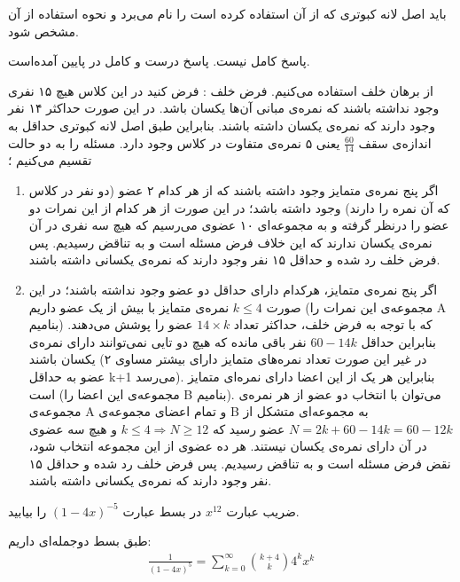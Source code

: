 \documentclass[11pt,largemargins]{h2wp}
\begin{document}
باید اصل لانه کبوتری که از آن استفاده کرده است را نام می‌برد و نحوه استفاده از آن مشخص شود.


پاسخ کامل نیست. پاسخ درست و کامل در پایین آمده‌است.




از برهان خلف استفاده می‌کنیم. فرض خلف : فرض کنید در این کلاس هیچ ۱۵ نفری وجود نداشته باشند که نمره‌ی مبانی آن‌ها یکسان باشد.
در این صورت حداکثر ۱۴ نفر وجود دارند که نمره‌ی یکسان داشته باشند. بنابراین  طبق اصل لانه کبوتری حداقل به اندازه‌ی سقف
$\frac{60}{14}$
یعنی ۵ نمره‌ی متفاوت در کلاس وجود دارد. مسئله را به دو حالت تقسیم می‌کنیم ؛
\begin{enumerate}
    \item 
    اگر پنج نمره‌ی متمایز وجود داشته باشند که از هر کدام ۲ عضو
    (دو نفر در کلاس که آن نمره را دارند)
    وجود داشته باشد؛ در این صورت از هر کدام از این نمرات دو عضو را درنظر گرفته و به مجموعه‌ای ۱۰ عضوی
    می‌رسیم که هیچ سه نفری در آن نمره‌ی یکسان ندارند که این خلاف فرض مسئله است و به تناقض رسیدیم.
    پس فرض خلف رد شده و حداقل ۱۵ نفر وجود دارند که نمره‌ی یکسانی داشته باشند.
    
    \item 
    اگر پنج نمره‌ی متمایز، هرکدام دارای حداقل دو عضو وجود نداشته باشند؛
    در این صورت 
    $k \le 4$
    نمره‌ی متمایز با بیش از یک عضو داریم
    (مجموعه‌ی این نمرات را A بنامیم)
    که با توجه به فرض خلف، حداکثر تعداد
    $14 \times k$
    عضو را پوشش می‌دهند. بنابراین حداقل 
    $60 - 14k$
    نفر باقی مانده که هیچ دو تایی نمی‌توانند دارای نمره‌ی یکسان باشند
    (در غیر این صورت تعداد نمره‌های متمایز دارای بیشتر مساوی ۲ عضو به حداقل k+1 می‌رسد).
    بنابراین هر یک از این اعضا دارای نمره‌ای متمایز است
    (مجموعه‌ی این اعضا را B بنامیم).
    می‌توان با انتخاب دو عضو از هر نمره‌ی مجموعه‌ی
    A
    و تمام اعضای مجموعه‌‌ی
    B
    به مجموعه‌ای متشکل از
    $N = 2k + 60 - 14k = 60 - 12k$
    عضو رسید که
    $k \le 4 \Rightarrow N \ge 12$
    و هیچ سه عضوی در آن دارای نمره‌ی یکسان نیستند.
    هر ده عضوی از این مجموعه انتخاب شود، نقض فرض مسئله است و به تناقض رسیدیم.
    پس فرض خلف رد شده و حداقل ۱۵ نفر وجود دارند که نمره‌ی یکسانی داشته باشند.
\end{enumerate}



\question


ضریب عبارت $ x ^ {12}$
در بسط عبارت
$(1-4x)^{-5}$
را بیابید.

\solution
طبق بسط دوجمله‌ای داریم:    
    \begin{align*}
    \frac{1}{(1-4x)^5}=\sum\limits_{k=0}^{\infty} \binom{k+4}{k}  4 ^ k  x^ k              
    \end{align*}
    
\end{document}
